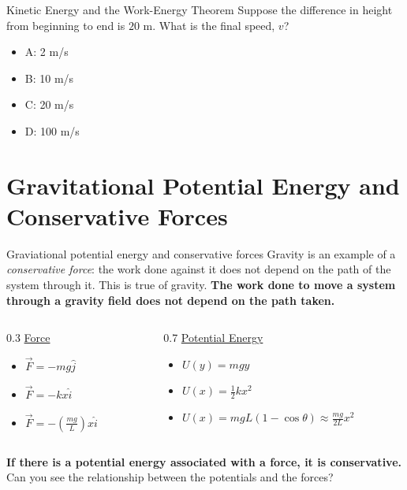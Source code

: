 \documentclass{beamer}
\begin{document}
\begin{frame}{Kinetic Energy and the Work-Energy Theorem}
Suppose the difference in height from beginning to end is $20$ m.  What is the final speed, $v$? \\ \vspace{1cm}
\begin{itemize}
\item A: 2 m/s
\item B: 10 m/s
\item C: 20 m/s
\item D: 100 m/s
\end{itemize}
\end{frame}

\section{Gravitational Potential Energy and Conservative Forces}

\begin{frame}{Graviational potential energy and conservative forces}
Gravity is an example of a \textit{conservative force}: the work done against it does not depend on the path of the system through it.  This is true of gravity.  \textbf{The work done to move a system through a gravity field does not depend on the path taken.} \\ \vspace{1cm}
\begin{columns}[T]
\begin{column}{0.3\textwidth}
\centering
\underline{Force}
\begin{itemize}
\item $\vec{F} = -mg\hat{j}$
\item $\vec{F} = -kx\hat{i}$
\item $\vec{F} = -\left(\frac{mg}{L}\right)x\hat{i}$
\end{itemize}
\end{column}
\begin{column}{0.7\textwidth}
\centering
\underline{Potential Energy}
\begin{itemize}
\item $U(y) = mgy$
\item $U(x) = \frac{1}{2}kx^2$
\item $U(x) = mgL(1-\cos\theta) \approx \frac{mg}{2L}x^2$
\end{itemize}
\end{column}
\end{columns} \vspace{0.5cm}
\small
\textbf{If there is a potential energy associated with a force, it is conservative.}  Can you see the relationship between the potentials and the forces?
\end{frame}
\end{document}
